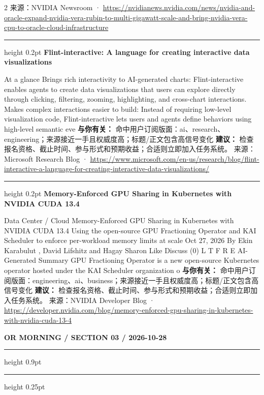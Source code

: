 \documentclass[10.5pt]{ctexart}
\begin{document}
\begin{multicols}{2}
{\footnotesize\color{ormuted} 来源：NVIDIA Newsroom · \url{https://nvidianews.nvidia.com/news/nvidia-and-oracle-expand-nvidia-vera-rubin-to-multi-gigawatt-scale-and-bring-nvidia-vera-cpu-to-oracle-cloud-infrastructure}}
\vspace{2mm}
\hrule height 0.2pt
\vspace{2mm}
{\large\bfseries Flint-interactive: A language for creating interactive data visualizations}\par
At a glance Brings rich interactivity to AI-generated charts: Flint-interactive enables agents to create data visualizations that users can explore directly through clicking, filtering, zooming, highlighting, and cross-chart interactions. Makes complex interactions easier to build: Instead of requiring low-level visualization code, Flint-interactive lets users and agents define behaviors using high-level semantic eve
\textbf{与你有关：} 命中用户订阅版面：ai、research、engineering；来源接近一手且权威度高；标题/正文包含高信号变化
\textbf{建议：} 检查报名资格、截止时间、参与形式和预期收益；合适则立即加入任务系统。
{\footnotesize\color{ormuted} 来源：Microsoft Research Blog · \url{https://www.microsoft.com/en-us/research/blog/flint-interactive-a-language-for-creating-interactive-data-visualizations/}}
\vspace{2mm}
\hrule height 0.2pt
\vspace{2mm}
{\large\bfseries Memory-Enforced GPU Sharing in Kubernetes with NVIDIA CUDA 13.4}\par
Data Center / Cloud Memory-Enforced GPU Sharing in Kubernetes with NVIDIA CUDA 13.4 Using the open-source GPU Fractioning Operator and KAI Scheduler to enforce per-workload memory limits at scale Oct 27, 2026 By Ekin Karabulut , David Lifshitz and Hagay Sharon Like Discuss (0) L T F R E AI-Generated Summary GPU Fractioning Operator is a new open-source Kubernetes operator hosted under the KAI Scheduler organization o
\textbf{与你有关：} 命中用户订阅版面：engineering、ai、business；来源接近一手且权威度高；标题/正文包含高信号变化
\textbf{建议：} 检查报名资格、截止时间、参与形式和预期收益；合适则立即加入任务系统。
{\footnotesize\color{ormuted} 来源：NVIDIA Developer Blog · \url{https://developer.nvidia.com/blog/memory-enforced-gpu-sharing-in-kubernetes-with-nvidia-cuda-13-4}}
\end{multicols}
\newpage
{\small\bfseries OR MORNING / SECTION 03 / 2026-10-28}
\vspace{2mm}
\hrule height 0.9pt
\vspace{1.5mm}
\hrule height 0.25pt
\vspace{4mm}
\end{document}
